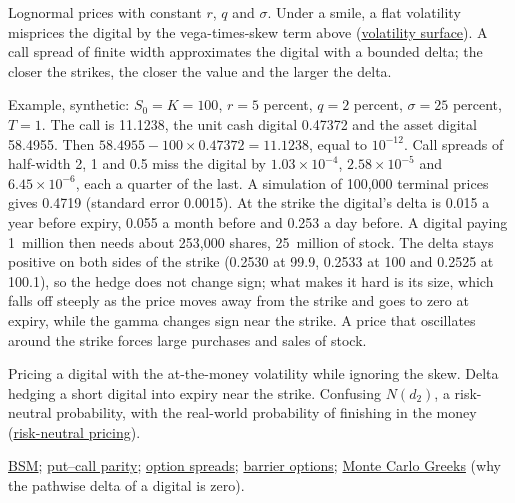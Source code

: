 \begin{qfmethod}
 Lognormal prices with constant $r$, $q$ and $\sigma$. Under a smile, a flat volatility misprices the digital by the vega-times-skew term above (\hyperref[def:implied-volatility-surface]{volatility surface}). A call spread of finite width approximates the digital with a bounded delta; the closer the strikes, the closer the value and the larger the delta.

 Example, synthetic: $S_0=K=100$, $r=5$ percent, $q=2$ percent, $\sigma=25$ percent, $T=1$. The call is 11.1238, the unit cash digital 0.47372 and the asset digital 58.4955. Then $58.4955-100\times0.47372=11.1238$, equal to $10^{-12}$. Call spreads of half-width 2, 1 and 0.5 miss the digital by $1.03\times10^{-4}$, $2.58\times10^{-5}$ and $6.45\times10^{-6}$, each a quarter of the last. A simulation of 100{,}000 terminal prices gives 0.4719 (standard error 0.0015). At the strike the digital's delta is 0.015 a year before expiry, 0.055 a month before and 0.253 a day before. A digital paying 1~million then needs about 253{,}000 shares, 25~million of stock. The delta stays positive on both sides of the strike (0.2530 at 99.9, 0.2533 at 100 and 0.2525 at 100.1), so the hedge does not change sign; what makes it hard is its size, which falls off steeply as the price moves away from the strike and goes to zero at expiry, while the gamma changes sign near the strike. A price that oscillates around the strike forces large purchases and sales of stock.

 Pricing a digital with the at-the-money volatility while ignoring the skew. Delta hedging a short digital into expiry near the strike. Confusing $N(d_2)$, a risk-neutral probability, with the real-world probability of finishing in the money (\hyperref[res:risk-neutral-pricing-feynman-kac]{risk-neutral pricing}).

 \hyperref[mod:black-scholes-merton]{BSM}; \hyperref[res:put-call-forward-parity]{put--call parity}; \hyperref[meth:option-spreads-volatility-strategies]{option spreads}; \hyperref[meth:barrier-option-valuation]{barrier options}; \hyperref[meth:monte-carlo-greeks]{Monte Carlo Greeks} (why the pathwise delta of a digital is zero).

\end{qfmethod}


